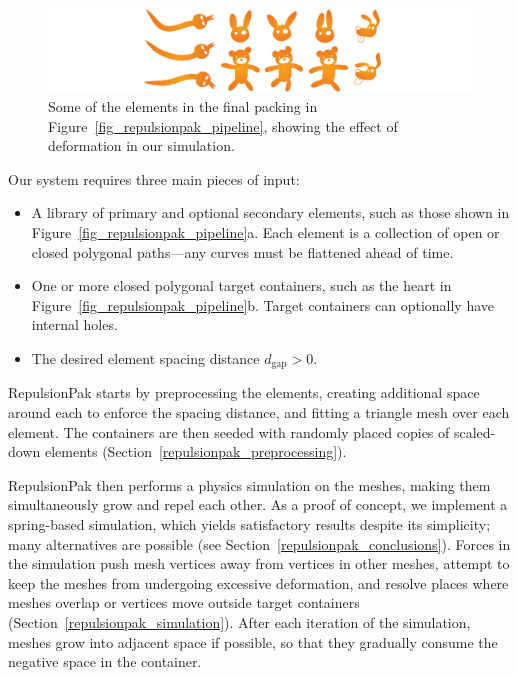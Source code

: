\begin{figure}[h]
\centering
\includegraphics[width=1.0\textwidth]{figures/repulsionpak/pipeline_defviz_csk.pdf}
\caption[Element deformation]{
	\label{fig_defviz}
	Some of the elements in the final packing in Figure~\ref{fig_repulsionpak_pipeline}, 
	showing the effect of deformation in our simulation.
}
\end{figure}

Our system requires three main pieces of input:
\begin{itemize}
	\item A library of primary and optional secondary elements, such
		as those shown in Figure~\ref{fig_repulsionpak_pipeline}a.
	      Each element is a collection of 
		  open or closed polygonal paths---any curves must
		  be flattened ahead of time.
	\item One or more closed polygonal target containers, such as the
		heart in Figure~\ref{fig_repulsionpak_pipeline}b.  Target containers can optionally
		have internal holes.
	\item The desired element spacing distance $d_\mathrm{gap}>0$.
\end{itemize}

RepulsionPak starts by preprocessing the elements, creating additional space around
each to enforce the spacing distance, and fitting a triangle mesh over each element.
The containers are then seeded with randomly placed
copies of scaled-down elements 
(Section~\ref{repulsionpak_preprocessing}).

RepulsionPak then performs a physics simulation on the meshes, 
making them simultaneously grow and repel each other. As a
proof of concept, we implement a spring-based 
simulation, which yields satisfactory results despite its simplicity;
many alternatives are possible 
(see Section~\ref{repulsionpak_conclusions}).
Forces in the simulation push mesh vertices away from vertices in other meshes,
attempt to keep the meshes from undergoing excessive deformation, and resolve
places where meshes overlap or vertices move outside target containers
(Section~\ref{repulsionpak_simulation}).
After each iteration of the simulation, meshes grow into adjacent space
if possible, so that they gradually consume the negative space in the container.

